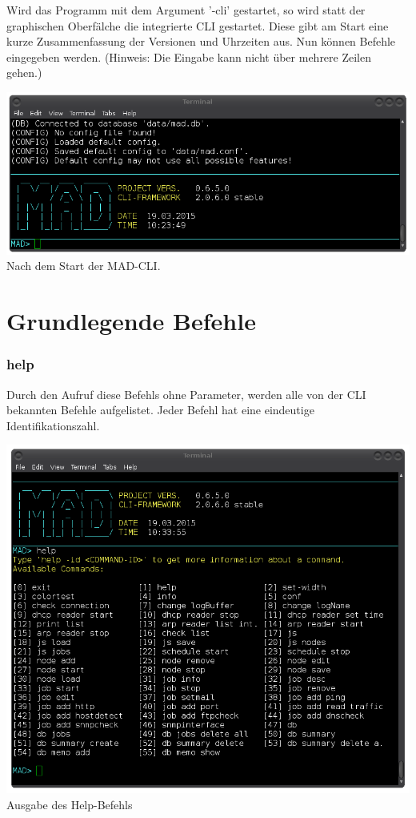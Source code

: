 \documentclass[12pt,a4paper]{report}
\begin{document}
Wird das Programm mit dem Argument '-cli' gestartet, so wird statt der graphischen Oberfälche die integrierte CLI gestartet. Diese gibt am Start eine kurze Zusammenfassung der Versionen und Uhrzeiten aus. Nun können Befehle eingegeben werden. (Hinweis: Die Eingabe kann nicht über mehrere Zeilen gehen.)\\

\begin{center}
\includegraphics[scale=0.5]{img/cli_mad.png}\\
Nach dem Start der MAD-CLI.
\end{center}

\section{Grundlegende Befehle}

\subsubsection{help}

Durch den Aufruf diese Befehls ohne Parameter, werden alle von der CLI bekannten Befehle aufgelistet. Jeder Befehl hat eine eindeutige Identifikationszahl.\\

\begin{center}
\includegraphics[scale=0.5]{img/cli_help.png}\\
Ausgabe des Help-Befehls
\end{center}
\end{document}
